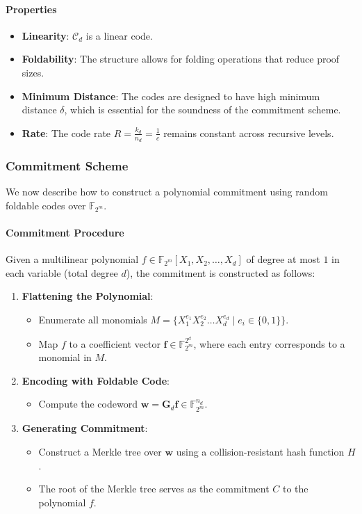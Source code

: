 \documentclass{article}
\theoremstyle{plain}
\theoremstyle{definition}
\theoremstyle{remark}
\theoremstyle{problem}
\begin{document}
\paragraph{Properties}

\begin{itemize}
    \item \textbf{Linearity}: $\mathcal{C}_d$ is a linear code.
    \item \textbf{Foldability}: The structure allows for folding operations that reduce proof sizes.
    \item \textbf{Minimum Distance}: The codes are designed to have high minimum distance $\delta$, which is essential for the soundness of the commitment scheme.
    \item \textbf{Rate}: The code rate $R = \frac{k_d}{n_d} = \frac{1}{c}$ remains constant across recursive levels.
\end{itemize}

\subsubsection{Commitment Scheme}

We now describe how to construct a polynomial commitment using random foldable codes over $\mathbb{F}_{2^m}$.

\paragraph{Commitment Procedure}

Given a multilinear polynomial $f \in \mathbb{F}_{2^m}[X_1, X_2, \dots, X_d]$ of degree at most $1$ in each variable (total degree $d$), the commitment is constructed as follows:

\begin{enumerate}
    \item \textbf{Flattening the Polynomial}:
    \begin{itemize}
        \item Enumerate all monomials $M = \{X_1^{e_1} X_2^{e_2} \dots X_d^{e_d} \mid e_i \in \{0,1\}\}$.
        \item Map $f$ to a coefficient vector $\mathbf{f} \in \mathbb{F}_{2^m}^{2^d}$, where each entry corresponds to a monomial in $M$.
    \end{itemize}
    \item \textbf{Encoding with Foldable Code}:
    \begin{itemize}
        \item Compute the codeword $\mathbf{w} = \mathbf{G}_d \mathbf{f} \in \mathbb{F}_{2^m}^{n_d}$.
    \end{itemize}
    \item \textbf{Generating Commitment}:
    \begin{itemize}
        \item Construct a Merkle tree over $\mathbf{w}$ using a collision-resistant hash function $H$.
        \item The root of the Merkle tree serves as the commitment $C$ to the polynomial $f$.
    \end{itemize}
\end{enumerate}
\end{document}
